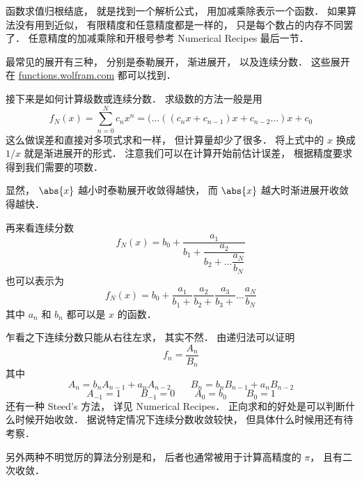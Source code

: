 
函数求值归根结底， 就是找到一个解析公式， 用加减乘除表示一个函数． 如果算法没有用到近似， 有限精度和任意精度都是一样的， 只是每个数占的内存不同罢了． 任意精度的加减乘除和开根号参考 Numerical Recipes 最后一节．

最常见的展开有三种， 分别是泰勒展开， 渐进展开， 以及连续分数． 这些展开在 \href{functions.wolfram.com}{\color{blue}functions.wolfram.com} 都可以找到．

接下来是如何计算级数或连续分数． 求级数的方法一般是用
\begin{equation}
f_N(x) = \sum_{n = 0}^N c_n x^n = (\dots ((c_n x + c_{n-1})x + c_{n-2} \dots )x + c_0
\end{equation}
这么做误差和直接对多项式求和一样， 但计算量却少了很多． 将上式中的 $x$ 换成 $1/x$ 就是渐进展开的形式． 注意我们可以在计算开始前估计误差， 根据精度要求得到我们需要的项数．

显然， $\abs{x}$ 越小时泰勒展开收敛得越快， 而 $\abs{x}$ 越大时渐进展开收敛得越快．

再来看连续分数
\begin{equation}
f_N(x) = b_0 + \dfrac{a_1}{b_1 + \dfrac{a_2}{b_2 + \dots \dfrac{a_N}{b_N}}}
\end{equation}
也可以表示为
\begin{equation}
f_N(x) = b_0 + \frac{a_1}{b_1 +} \frac{a_2}{b_2 +} \frac{a_3}{b_3 +} \dots \frac{a_N}{b_N}
\end{equation}
其中 $a_n$ 和 $b_n$ 都可以是 $x$ 的函数．

乍看之下连续分数只能从右往左求， 其实不然． 由递归法可以证明
\begin{equation}
f_n = \frac{A_n}{B_n}
\end{equation}
其中
\begin{equation}
A_n = b_n A_{n-1} + a_n A_{n-2} \qquad
B_n = b_n B_{n-1} + a_n B_{n-2}
\end{equation}
\begin{equation}
A_{-1} = 1 \qquad B_{-1} = 0
\qquad A_0 = b_0 \qquad B_0 = 1
\end{equation}
还有一种 Steed's 方法， 详见 Numerical Recipes． 正向求和的好处是可以判断什么时候开始收敛．
据说特定情况下连续分数收敛较快， 但具体什么时候用还有待考察．

另外两种不明觉厉的算法分别是和， 后者也通常被用于计算高精度的 $\pi$， 且有二次收敛．
